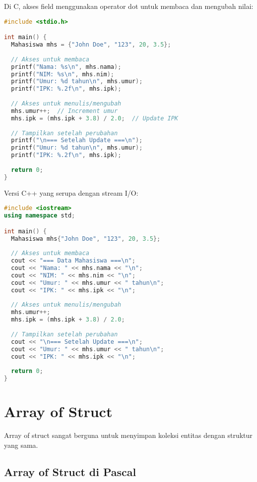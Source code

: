 \documentclass[../main.tex]{subfiles}
\begin{document}
Di C, akses field menggunakan operator dot untuk membaca dan mengubah nilai:

\begin{lstlisting}[language=C, caption={Akses field di C}]
#include <stdio.h>

int main() {
  Mahasiswa mhs = {"John Doe", "123", 20, 3.5};
  
  // Akses untuk membaca
  printf("Nama: %s\n", mhs.nama);
  printf("NIM: %s\n", mhs.nim);
  printf("Umur: %d tahun\n", mhs.umur);
  printf("IPK: %.2f\n", mhs.ipk);
  
  // Akses untuk menulis/mengubah
  mhs.umur++;  // Increment umur
  mhs.ipk = (mhs.ipk + 3.8) / 2.0;  // Update IPK
  
  // Tampilkan setelah perubahan
  printf("\n=== Setelah Update ===\n");
  printf("Umur: %d tahun\n", mhs.umur);
  printf("IPK: %.2f\n", mhs.ipk);
  
  return 0;
}
\end{lstlisting}

Versi C++ yang serupa dengan stream I/O:

\begin{lstlisting}[language=C++, caption={Akses field di C++}]
#include <iostream>
using namespace std;

int main() {
  Mahasiswa mhs{"John Doe", "123", 20, 3.5};
  
  // Akses untuk membaca
  cout << "=== Data Mahasiswa ===\n";
  cout << "Nama: " << mhs.nama << "\n";
  cout << "NIM: " << mhs.nim << "\n";
  cout << "Umur: " << mhs.umur << " tahun\n";
  cout << "IPK: " << mhs.ipk << "\n";
  
  // Akses untuk menulis/mengubah
  mhs.umur++;
  mhs.ipk = (mhs.ipk + 3.8) / 2.0;
  
  // Tampilkan setelah perubahan
  cout << "\n=== Setelah Update ===\n";
  cout << "Umur: " << mhs.umur << " tahun\n";
  cout << "IPK: " << mhs.ipk << "\n";
  
  return 0;
}
\end{lstlisting}

\section{Array of Struct}

Array of struct sangat berguna untuk menyimpan koleksi entitas dengan struktur yang sama.

\subsection{Array of Struct di Pascal}
\end{document}
